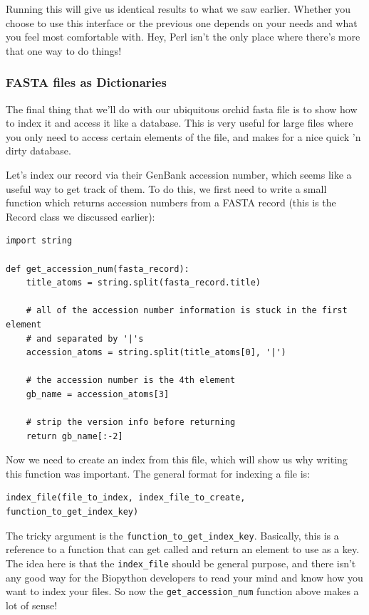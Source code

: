 \documentclass{article}
\begin{document}
Running this will give us identical results to what we saw earlier. Whether you choose to use this interface or the previous one depends on your needs and what you feel most comfortable with. Hey, Perl isn't the only place where there's more that one way to do things!

\subsubsection{FASTA files as Dictionaries}

The final thing that we'll do with our ubiquitous orchid fasta file is to show how to index it and access it like a database. This is very useful for large files where you only need to access certain elements of the file, and makes for a nice quick 'n dirty database.


Let's index our record via their GenBank accession number, which seems like a useful way to get track of them. To do this, we first need to write a small function which returns accession numbers from a FASTA record (this is the Record class we discussed earlier):

\begin{verbatim}
import string

def get_accession_num(fasta_record):
    title_atoms = string.split(fasta_record.title)

    # all of the accession number information is stuck in the first element
    # and separated by '|'s
    accession_atoms = string.split(title_atoms[0], '|')
 
    # the accession number is the 4th element
    gb_name = accession_atoms[3]

    # strip the version info before returning
    return gb_name[:-2]
\end{verbatim}

Now we need to create an index from this file, which will show us why writing this function was important. The general format for indexing a file is:

\begin{verbatim}
index_file(file_to_index, index_file_to_create, function_to_get_index_key)
\end{verbatim}

The tricky argument is the \verb|function_to_get_index_key|. Basically, this is a reference to a function that can get called and return an element to use as a key. The idea here is that the \verb|index_file| should be general purpose, and there isn't any good way for the Biopython developers to read your mind and know how you want to index your files. So now the \verb|get_accession_num| function above makes a lot of sense!
\end{document}
